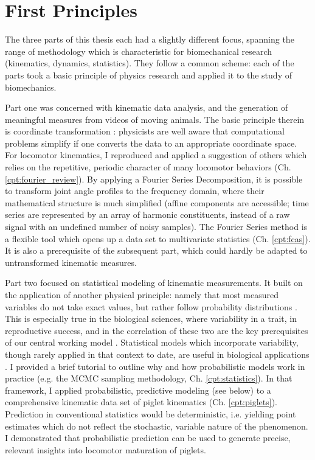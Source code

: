 \section{First Principles}
\label{sec:org0dd5fda}
The three parts of this thesis each had a slightly different focus, spanning the range of methodology which is characteristic for biomechanical research (kinematics, dynamics, statistics).
They follow a common scheme:
each of the parts took a basic principle of physics research and applied it to the study of biomechanics.


Part one was concerned with kinematic data analysis, and the generation of meaningful measures from videos of moving animals.
The basic principle therein is coordinate transformation \citep{Tipler2007}: physicists are well aware that computational problems simplify if one converts the data to an appropriate coordinate space.
For locomotor kinematics, I reproduced and applied a suggestion of others \citep{Bernstein1927a,Webb2007} which relies on the repetitive, periodic character of many locomotor behaviors (Ch. \ref{cpt:fourier_review}).
By applying a Fourier Series Decomposition, it is possible to transform joint angle profiles to the frequency domain, where their mathematical structure is much simplified (affine components are accessible; time series are represented by an array of harmonic constituents, instead of a raw signal with an undefined number of noisy samples).
The Fourier Series method is a flexible tool which opens up a data set to multivariate statistics (Ch. \ref{cpt:fcas}).
It is also a prerequisite of the subsequent part, which could hardly be adapted to untransformed kinematic measures.


Part two focused on statistical modeling of kinematic measurements.
It built on the application of another physical principle: namely that most measured variables do not take exact values, but rather follow probability distributions \citep{2022Probability}.
This is especially true in the biological sciences, where variability in a trait, in reproductive success, and in the correlation of these two are the key prerequisites of our central working model \citep{Darwin1859}.
Statistical models which incorporate variability, though rarely applied in that context to date, are useful in biological applications \citep{Roraas2019,DeGroote2021}.
I provided a brief tutorial to outline why and how probabilistic models work in practice (e.g. the MCMC sampling methodology, Ch. \ref{cpt:statistics}).
In that framework, I applied probabilistic, predictive modeling (see below) to a comprehensive kinematic data set of piglet kinematics (Ch. \ref{cpt:piglets}).
Prediction in conventional statistics would be deterministic, i.e. yielding point estimates which do not reflect the stochastic, variable nature of the phenomenon.
I demonstrated that probabilistic prediction can be used to generate precise, relevant insights into locomotor maturation of piglets.


